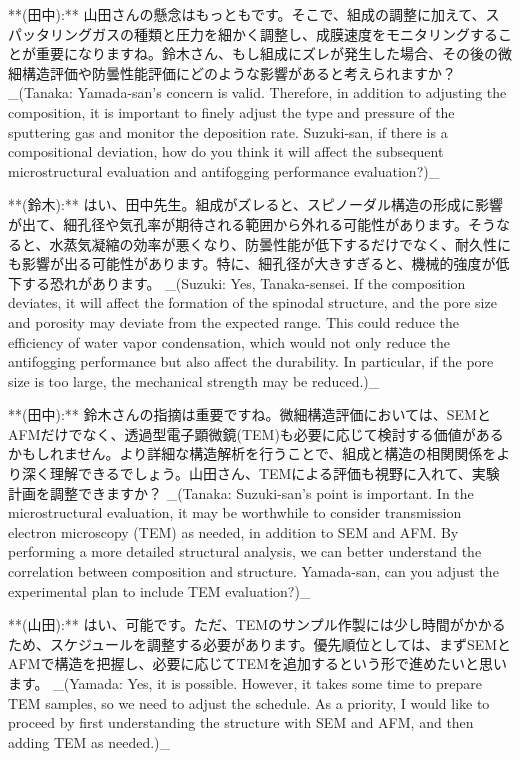 \documentclass{article}
\begin{document}
**(田中):** 山田さんの懸念はもっともです。そこで、組成の調整に加えて、スパッタリングガスの種類と圧力を細かく調整し、成膜速度をモニタリングすることが重要になりますね。鈴木さん、もし組成にズレが発生した場合、その後の微細構造評価や防曇性能評価にどのような影響があると考えられますか？
_(Tanaka: Yamada-san's concern is valid. Therefore, in addition to adjusting the composition, it is important to finely adjust the type and pressure of the sputtering gas and monitor the deposition rate. Suzuki-san, if there is a compositional deviation, how do you think it will affect the subsequent microstructural evaluation and antifogging performance evaluation?)_

**(鈴木):** はい、田中先生。組成がズレると、スピノーダル構造の形成に影響が出て、細孔径や気孔率が期待される範囲から外れる可能性があります。そうなると、水蒸気凝縮の効率が悪くなり、防曇性能が低下するだけでなく、耐久性にも影響が出る可能性があります。特に、細孔径が大きすぎると、機械的強度が低下する恐れがあります。
_(Suzuki: Yes, Tanaka-sensei. If the composition deviates, it will affect the formation of the spinodal structure, and the pore size and porosity may deviate from the expected range. This could reduce the efficiency of water vapor condensation, which would not only reduce the antifogging performance but also affect the durability. In particular, if the pore size is too large, the mechanical strength may be reduced.)_

**(田中):** 鈴木さんの指摘は重要ですね。微細構造評価においては、SEMとAFMだけでなく、透過型電子顕微鏡(TEM)も必要に応じて検討する価値があるかもしれません。より詳細な構造解析を行うことで、組成と構造の相関関係をより深く理解できるでしょう。山田さん、TEMによる評価も視野に入れて、実験計画を調整できますか？
_(Tanaka: Suzuki-san's point is important. In the microstructural evaluation, it may be worthwhile to consider transmission electron microscopy (TEM) as needed, in addition to SEM and AFM. By performing a more detailed structural analysis, we can better understand the correlation between composition and structure. Yamada-san, can you adjust the experimental plan to include TEM evaluation?)_

**(山田):** はい、可能です。ただ、TEMのサンプル作製には少し時間がかかるため、スケジュールを調整する必要があります。優先順位としては、まずSEMとAFMで構造を把握し、必要に応じてTEMを追加するという形で進めたいと思います。
_(Yamada: Yes, it is possible. However, it takes some time to prepare TEM samples, so we need to adjust the schedule. As a priority, I would like to proceed by first understanding the structure with SEM and AFM, and then adding TEM as needed.)_
\end{document}
